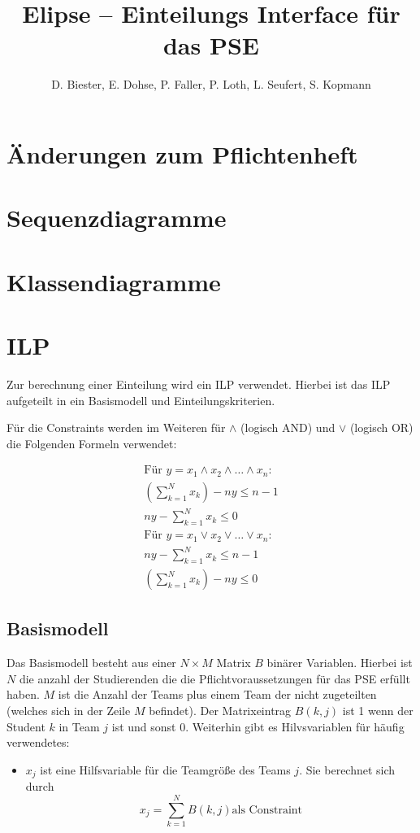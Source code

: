 \documentclass[parskip=full]{scrartcl}
\begin{document}
\title{Elipse -- Einteilungs Interface für das PSE}
\author{D. Biester, E. Dohse, P. Faller, P. Loth, L. Seufert, S. Kopmann}
\zweitgutachter{}

\tableofcontents
\pagebreak



\section{Änderungen zum Pflichtenheft}

\section{Sequenzdiagramme}

\section{Klassendiagramme}

\section{ILP}
Zur berechnung einer Einteilung wird ein ILP verwendet. Hierbei ist das ILP
aufgeteilt in ein Basismodell und Einteilungskriterien. 

Für die Constraints werden im Weiteren für $\wedge$ (logisch AND) und
$\vee$ (logisch OR) die Folgenden Formeln verwendet:

\begin{gather*}
\text{Für } y = x_1 \wedge x_2 \wedge \ldots \wedge x_n: \\
\left(\sum_{k=1}^{N}x_k \right)-ny \le n-1\\
ny - \sum_{k=1}^{N}x_k \le 0\\
\text{Für } y = x_1 \vee x_2 \vee \ldots \vee x_n:\\
ny - \sum_{k=1}^{N}x_k \le n-1\\
\left(\sum_{k=1}^{N}x_k \right) - ny \le 0
\end{gather*}
\subsection{Basismodell}
Das Basismodell besteht aus einer $N \times M$ Matrix $B$ binärer Variablen.
Hierbei ist $N$ die anzahl der Studierenden die die Pflichtvoraussetzungen für das PSE
erfüllt haben. $M$ ist die Anzahl der Teams plus einem Team
der nicht zugeteilten (welches sich in der Zeile $M$ befindet). Der
Matrixeintrag $B(k,j)$ ist 1 wenn der Student $k$ in Team $j$ ist und sonst 0.
Weiterhin gibt es Hilvsvariablen für häufig verwendetes: 
\begin{itemize}
  \item $x_j$ ist eine Hilfsvariable für die Teamgröße des Teams $j$. Sie berechnet
sich durch
\begin{equation*}
x_j = \sum_{k = 1}^{N} B(k,j) \text{
als Constraint}
\end{equation*}
\end{itemize}
\end{document}
